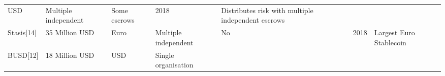 \documentclass[english,]{IEEEtran}
\begin{document}
\begin{table}[t]
\begin{center}
\begin{supertabular}[]{@{}lllllll@{}}
\begin{minipage}[t]{0.07\textwidth}
USD\strut
\end{minipage} & \begin{minipage}[t]{0.10\textwidth}\raggedright
Multiple independent\strut
\end{minipage} & \begin{minipage}[t]{0.07\textwidth}\raggedright
Some escrows\strut
\end{minipage} & \begin{minipage}[t]{0.04\textwidth}\raggedright
2018\strut
\end{minipage} & \begin{minipage}[t]{0.30\textwidth}\raggedright
Distributes risk with multiple independent escrows\strut
\end{minipage}\tabularnewline
\begin{minipage}[t]{0.14\textwidth}\raggedright
Stasis{[}14{]}\strut
\end{minipage} & \begin{minipage}[t]{0.08\textwidth}\raggedright
35 Million USD\strut
\end{minipage} & \begin{minipage}[t]{0.07\textwidth}\raggedright
Euro\strut
\end{minipage} & \begin{minipage}[t]{0.10\textwidth}\raggedright
Multiple independent\strut
\end{minipage} & \begin{minipage}[t]{0.07\textwidth}\raggedright
No\strut
\end{minipage} & \begin{minipage}[t]{0.04\textwidth}\raggedright
2018\strut
\end{minipage} & \begin{minipage}[t]{0.30\textwidth}\raggedright
Largest Euro Stablecoin\strut
\end{minipage}\tabularnewline
\begin{minipage}[t]{0.14\textwidth}\raggedright
BUSD{[}12{]}\strut
\end{minipage} & \begin{minipage}[t]{0.08\textwidth}\raggedright
18 Million USD\strut
\end{minipage} & \begin{minipage}[t]{0.07\textwidth}\raggedright
USD\strut
\end{minipage} & \begin{minipage}[t]{0.10\textwidth}\raggedright
Single organisation\strut
\end{minipage} & \begin{minipage}[t]{0.07\textwidth}\raggedright

\end{minipage}
\end{supertabular}
\end{center}
\end{table}
\end{document}
